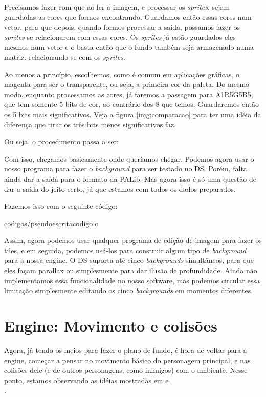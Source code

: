\documentclass[brazil]{abnt}
\begin{document}
Precisamos fazer com que ao ler a imagem, e processar os \textit{sprites}, sejam guardadas as cores que formos encontrando. Guardamos então essas cores num vetor, para que depois, quando formos processar a saída, possamos fazer os \textit{sprites} se relacionarem com essas cores. Os \textit{sprites} já estão guardados eles mesmos num vetor e o basta então que o fundo também seja armazenado numa matriz, relacionando-se com os \textit{sprites}.

Ao menos a princípio, escolhemos, como é comum em aplicações gráficas, o magenta para ser o transparente, ou seja, a primeira cor da paleta. Do mesmo modo, enquanto processamos as cores, já faremos a passagem para A1R5G5B5, que tem somente 5 bits de cor, ao contrário dos 8 que temos. Guardaremos então os 5 bits mais significativos. Veja a figura \ref{img:comparacao} para ter uma idéia da diferença que tirar os três bits menos significativos faz.

Ou seja, o procedimento passa a ser:



Com isso, chegamos basicamente onde queríamos chegar. Podemos agora usar o nosso programa para fazer o \textit{background} para ser testado no DS. Porém, falta ainda dar a saída para o formato da PALib. Mas agora isso é só uma questão de dar a saída do jeito certo, já que estamos com todos os dados preparados.

Fazemos isso com o seguinte código:


{codigos/pseudoescritacodigo.c}

Assim, agora podemos usar qualquer programa de edição de imagem para fazer os tiles, e em seguida, podemos usá-los para construir algum tipo de \textit{background} para a nossa engine. O DS suporta até cinco \textit{backgrounds} simultâneos, para que eles façam parallax ou simplesmente para dar ilusão de profundidade. Ainda não implementamos essa funcionalidade no nosso software, mas podemos circular essa limitação simplesmente editando os cinco \textit{backgrounds} em momentos diferentes.

\section{Engine: Movimento e colisões}

Agora, já tendo os meios para fazer o plano de fundo, é hora de voltar para a engine, começar a pensar no movimento básico do personagem principal, e nas colisões dele (e de outros personagens, como inimigos) com o ambiente. Nesse ponto, estamos observando as idéias mostradas em \cite[N Tutorial A]{NCollisionA} e \\\cite[N Tutorial B]{NCollisionB}.
\end{document}
